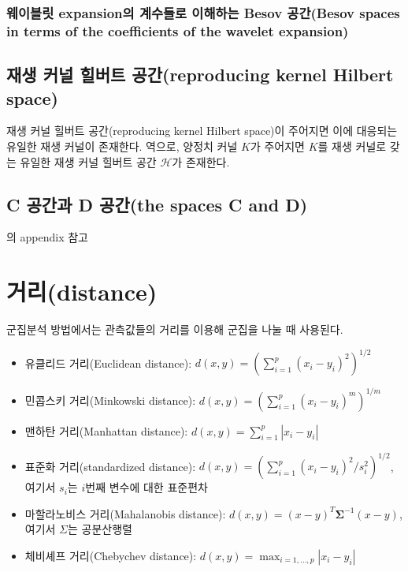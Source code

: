 \documentclass[b5paper,]{scrbook}
\theoremstyle{plain}
\theoremstyle{definition}
\numberwithin{equation}{section}
\begin{document}
\subsubsection{웨이블릿 expansion의 계수들로 이해하는 Besov 공간(Besov
spaces in terms of the coefficients of the wavelet
expansion)}\label{-expansion---besov-besov-spaces-in-terms-of-the-coefficients-of-the-wavelet-expansion}

\subsection{재생 커널 힐버트 공간(reproducing kernel Hilbert
space)}\label{---reproducing-kernel-hilbert-space}

재생 커널 힐버트 공간(reproducing kernel Hilbert space)이 주어지면 이에
대응되는 유일한 재생 커널이 존재한다. 역으로, 양정치 커널 \(K\)가
주어지면 \(K\)를 재생 커널로 갖는 유일한 재생 커널 힐버트 공간
\(\mathcal{H}\)가 존재한다.

\subsection{C 공간과 D 공간(the spaces C and
D)}\label{c--d-the-spaces-c-and-d}

\citep{Beran2013}의 appendix 참고

\section{거리(distance)}\label{distance}

군집분석 방법에서는 관측값들의 거리를 이용해 군집을 나눌 때 사용된다.

\begin{itemize}
\item
  유클리드 거리(Euclidean distance):
  \(d(x,y)=(\sum_{i=1}^{p}(x_{i}-y_{i})^{2})^{1/2}\)
\item
  민콥스키 거리(Minkowski distance):
  \(d(x,y)=(\sum_{i=1}^{p}(x_{i}-y_{i})^{m})^{1/m}\)
\item
  맨하탄 거리(Manhattan distance):
  \(d(x,y)=\sum_{i=1}^{p}|x_{i}-y_{i}|\)
\item
  표준화 거리(standardized distance):
  \(d(x,y)=(\sum_{i=1}^{p}(x_{i}-y_{i})^{2}/s_{i}^{2})^{1/2}\), 여기서
  \(s_{i}\)는 \(i\)번째 변수에 대한 표준편차
\item
  마할라노비스 거리(Mahalanobis distance):
  \(d(x,y)=(x-y)^{T}\boldsymbol{\Sigma}^{-1}(x-y)\), 여기서 \(\Sigma\)는
  공분산행렬
\item
  체비셰프 거리(Chebychev distance):
  \(d(x,y)=\max_{i=1,\ldots ,p}|x_{i}-y_{i}|\)
\end{itemize}
\end{document}
